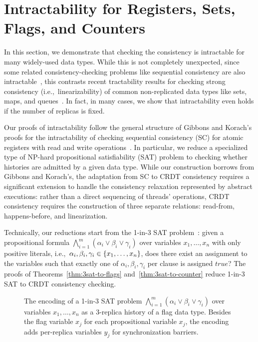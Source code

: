 
\section{Intractability for Registers, Sets, Flags, and Counters}
\label{sec:intractability}

In this section, we demonstrate that checking the consistency is intractable for many widely-used data types. While this is not completely unexpected, since some related consistency-checking problems like sequential consistency are also intractable~\cite{DBLP:journals/siamcomp/GibbonsK97}, this contrasts recent tractability results for checking strong consistency (i.e.,~linearizability) of common non-replicated data types like sets, maps, and queues~\cite{DBLP:journals/pacmpl/EmmiE19}. In fact, in many cases, we show that intractability even holds if the number of replicas is fixed.

Our proofs of intractability follow the general structure of Gibbons and Korach’s proofs for the intractability of checking sequential consistency (SC) for atomic registers with read and write operations~\cite{DBLP:journals/siamcomp/GibbonsK97}. In particular, we reduce a specialized type of NP-hard propositional satisfiability (SAT) problem to checking whether histories are admitted by a given data type. While our construction borrows from Gibbons and Korach’s, the adaptation from SC to CRDT consistency requires a significant extension to handle the consistency relaxation represented by abstract executions: rather than a direct sequencing of threads’ operations, CRDT consistency requires the construction of three separate relations: read-from, happens-before, and linearization.

Technically, our reductions start from the 1-in-3 SAT problem~\cite{DBLP:books/fm/GareyJ79}: given a propositional formula $\bigwedge_{i=1}^{m} (\alpha_i \lor \beta_i \lor \gamma_i)$ over variables $x_1, \ldots, x_n$ with only positive literals, i.e.,~$\alpha_i, \beta_i, \gamma_i \in {\{{ x_1, \ldots, x_n }\}}$, does there exist an assignment to the variables such that exactly one of $\alpha_i, \beta_i, \gamma_i$ per clause is assigned $\mathit{true}$? 
The proofs of Theorems~\ref{thm:3sat-to-flags} and~\ref{thm:3sat-to-counter} reduce 1-in-3 SAT to CRDT consistency checking.

  \begin{figure}[t]
    \centering
    {\scriptsize}
         \vspace{-1mm}
    \caption{The encoding of a 1-in-3 SAT problem $\bigwedge_{i=1}^{m} (\alpha_i \lor \beta_i \lor \gamma_i)$ over variables $x_1, \ldots, x_n$ as a 3-replica history of a flag data type. Besides the flag variable $x_j$ for each propositional variable $x_j$, the encoding adds per-replica variables $y_j$ for synchronization barriers.}
    \label{fig:3sat-to-flags}
    \vspace{-4mm}
  \end{figure}



